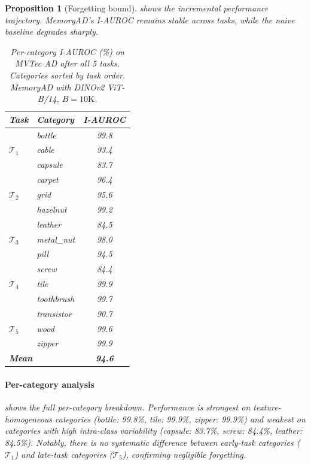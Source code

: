 \documentclass[conference]{IEEEtran}
\newcommand{\method}{MemoryAD}
\newtheorem{proposition}{Proposition}
\begin{document}
\begin{proposition}[Forgetting bound]
 shows the incremental performance trajectory. \method{}'s I-AUROC remains stable across tasks, while the naive baseline degrades sharply.

\begin{table}[htbp]
\centering
\caption{Per-category I-AUROC (\%) on MVTec AD after all 5 tasks. Categories sorted by task order. \method{} with DINOv2 ViT-B/14, $B=10\text{K}$.}
\label{tab:per_category}
\begin{tabular}{llc}
\toprule
Task & Category & I-AUROC \\
\midrule
\multirow{3}{*}{$\mathcal{T}_1$} & bottle     & 99.8 \\
                                  & cable      & 93.4 \\
                                  & capsule    & 83.7 \\
\midrule
\multirow{3}{*}{$\mathcal{T}_2$} & carpet     & 96.4 \\
                                  & grid       & 95.6 \\
                                  & hazelnut   & 99.2 \\
\midrule
\multirow{3}{*}{$\mathcal{T}_3$} & leather    & 84.5 \\
                                  & metal\_nut & 98.0 \\
                                  & pill       & 94.5 \\
\midrule
\multirow{3}{*}{$\mathcal{T}_4$} & screw      & 84.4 \\
                                  & tile       & 99.9 \\
                                  & toothbrush & 99.7 \\
\midrule
\multirow{3}{*}{$\mathcal{T}_5$} & transistor & 90.7 \\
                                  & wood       & 99.6 \\
                                  & zipper     & 99.9 \\
\midrule
\multicolumn{2}{l}{\textbf{Mean}} & \textbf{94.6} \\
\bottomrule
\end{tabular}
\end{table}

\paragraph{Per-category analysis}
 shows the full per-category breakdown. Performance is strongest on texture-homogeneous categories (bottle: 99.8\%, tile: 99.9\%, zipper: 99.9\%) and weakest on categories with high intra-class variability (capsule: 83.7\%, screw: 84.4\%, leather: 84.5\%). Notably, there is no systematic difference between early-task categories ($\mathcal{T}_1$) and late-task categories ($\mathcal{T}_5$), confirming negligible forgetting.


\end{proposition}
\end{document}
